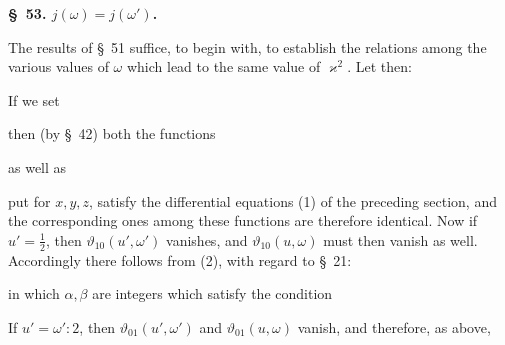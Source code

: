 
\begin{center}
\textbf{\S\ 53.  $j(\omega) = j(\omega')$.}
\end{center}

The results of \S\ 51 suffice, to begin with, to establish the relations among the various values of $\omega$ which lead to the same value of $\varkappa^2$. Let then:


If we set


then (by \S\ 42) both the functions


as well as


put for $x,y,z$, satisfy the differential equations (1) of the preceding section, and the corresponding ones among these functions are therefore identical. Now if $u'=\frac{1}{2}$, then $\vartheta_{10}(u',\omega')$ vanishes, and $\vartheta_{10}(u,\omega)$ must then vanish as well. Accordingly there follows from (2), with regard to \S\ 21:


in which $\alpha,\beta$ are integers which satisfy the condition


If $u'=\omega':2$, then $\vartheta_{01}(u',\omega')$ and $\vartheta_{01}(u,\omega)$ vanish, and therefore, as above,


